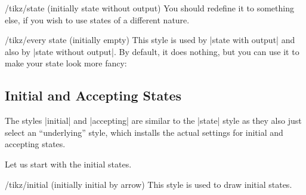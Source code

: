 \begin{stylekey}{/tikz/state (initially state without output)}
    You should redefine it to something else, if you wish to use states of a
    different nature.
\begin{codeexample}[]
\end{codeexample}
\end{stylekey}

\begin{stylekey}{/tikz/every state (initially \normalfont empty)}
    This style is used by |state with output| and also by
    |state without output|. By default, it does nothing, but you can use it to
    make your state look more fancy:
\begin{codeexample}[preamble={\usetikzlibrary{arrows,positioning}}]
\end{codeexample}
\end{stylekey}


\subsection{Initial and Accepting States}

The styles |initial| and |accepting| are similar to the |state| style as they
also just select an ``underlying'' style, which installs the actual settings
for initial and accepting states.

Let us start with the initial states.
%
\begin{stylekey}{/tikz/initial (initially initial by arrow)}
    This style is used to draw initial states.
\end{stylekey}

